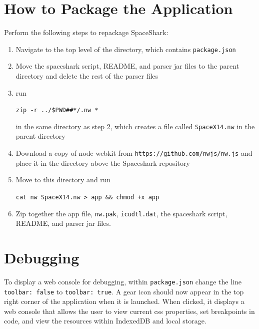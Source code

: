 \documentclass{hmcclinic}
\begin{document}
\section{How to Package the Application}
Perform the following steps to repackage SpaceShark:
\begin{enumerate}
  \item Navigate to the top level of the directory, which contains
    \texttt{package.json}
  \item Move the spaceshark script, README, and parser jar files to the parent directory
    and delete the rest of the parser files
  \item run
    \begin{center}\texttt{zip -r ../\${PWD\#\#*/}.nw *}\end{center} in the same
    directory as step 2, which creates a file
    called \texttt{SpaceX14.nw} in the parent directory
  \item Download a copy of node-webkit from
    \texttt{https://github.com/nwjs/nw.js} and
    place it in the directory above the Spaceshark repository
  \item Move to this directory and run 
    \begin{center}\texttt{cat nw SpaceX14.nw >
      app \&\& chmod +x app}\end{center}
  \item Zip together the app file, \texttt{nw.pak}, \texttt{icudtl.dat}, the spaceshark script,
    README, and parser jar files.
\end{enumerate}

\newpage
\section{Debugging}
To display a web console for debugging, within \texttt{package.json} change the line
\texttt{toolbar: false} to \texttt{toolbar: true}. A gear icon should now appear in the
top right corner of the application when it is launched. When clicked, it
displays a web console that allows the user to view current css properties,
set breakpoints in code, and view the resources within IndexedDB and local
storage.
\end{document}
